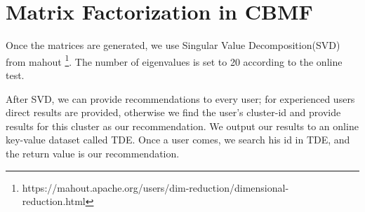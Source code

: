 \section{Matrix Factorization in CBMF}

Once the matrices are generated, we use Singular Value Decomposition(SVD) from mahout \footnote{https://mahout.apache.org/users/dim-reduction/dimensional-reduction.html}. The number of eigenvalues is set to 20 according to the online test.

After SVD, we can provide recommendations to every user; for experienced users direct results are provided, otherwise we find the user's cluster-id and provide results for this cluster as our recommendation. We output our results to an online key-value dataset called TDE. Once a user comes, we search his id in TDE, and the return value is our recommendation.


